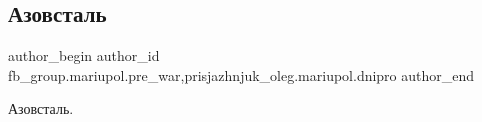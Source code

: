  
 
 
 
 

\subsection{Азовсталь}
\label{sec:05_02_2023.fb.fb_group.mariupol.pre_war.4.azovstal}
 
\ifcmt
 author_begin
   author_id fb_group.mariupol.pre_war,prisjazhnjuk_oleg.mariupol.dnipro
 author_end
\fi

Азовсталь.

